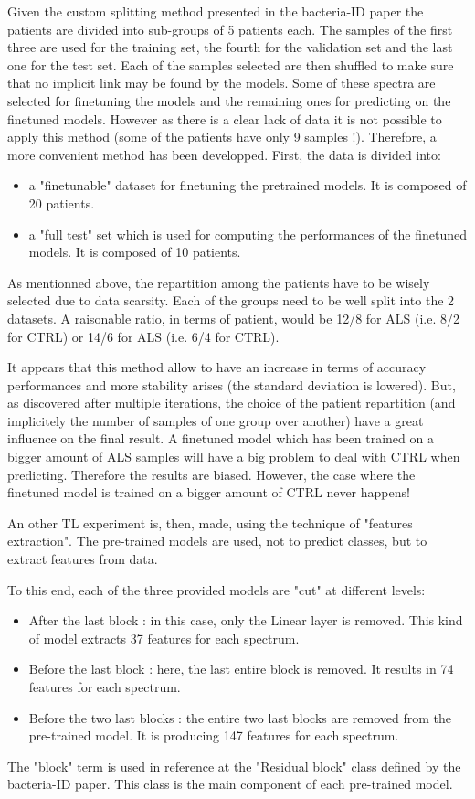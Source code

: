 Given the custom splitting method presented in the bacteria-ID paper\cite{bacteria-ID} the patients are divided into sub-groups of 5 patients each. The samples of the first three are used for the training set, the fourth for the validation set and the last one for the test set. Each of the samples selected are then shuffled to make sure that no implicit link may be found by the models. Some of these spectra are selected for finetuning the models and the remaining ones for predicting on the finetuned models.
However as there is a clear lack of data it is not possible to apply this method (some of the patients have only 9 samples !).
Therefore, a more convenient method has been developped. First, the data is divided into:
\begin{itemize}
\item a "finetunable" dataset for finetuning the pretrained models. It is composed of 20 patients.
\item a "full test" set which is used for computing the performances of the finetuned models. It is composed of 10 patients.
\end{itemize}  
As mentionned above, the repartition among the patients have to be wisely selected due to data scarsity. Each of the groups need to be well split into the 2 datasets. 
A raisonable ratio, in terms of patient, would be 12/8 for ALS (i.e. 8/2 for CTRL) or 14/6 for ALS (i.e. 6/4 for CTRL). 

It appears that this method allow to have an increase in terms of accuracy performances and more stability arises (the standard deviation is lowered). But, as discovered after multiple iterations, the choice of the patient repartition (and implicitely the number of samples of one group over another) have a great influence on the final result.
A finetuned model which has been trained on a bigger amount of ALS samples will have a big problem to deal with CTRL when predicting. Therefore the results are biased. 
However, the case where the finetuned model is trained on a bigger amount of CTRL never happens!

An other TL experiment is, then, made, using the technique of "features extraction". The pre-trained models are used, not to predict classes, but to extract features from data. 

To this end, each of the three provided models are "cut" at different levels:
\begin{itemize}
\item After the last block : in this case, only the Linear layer is removed. This kind of model extracts 37 features for each spectrum.
\item Before the last block : here, the last entire block is removed. It results in 74 features for each spectrum.
\item Before the two last blocks : the entire two last blocks are removed from the pre-trained model. It is producing 147 features for each spectrum.
\end{itemize}
The "block" term is used in reference at the "Residual block" class defined by the bacteria-ID paper\cite{bateria-ID}. This class is the main component of each pre-trained model.

